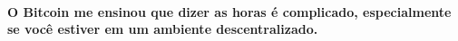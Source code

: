 \paragraph{O Bitcoin me ensinou que dizer as horas é complicado, especialmente se você estiver em um ambiente descentralizado.}

%
%
%
%
%
%
%
